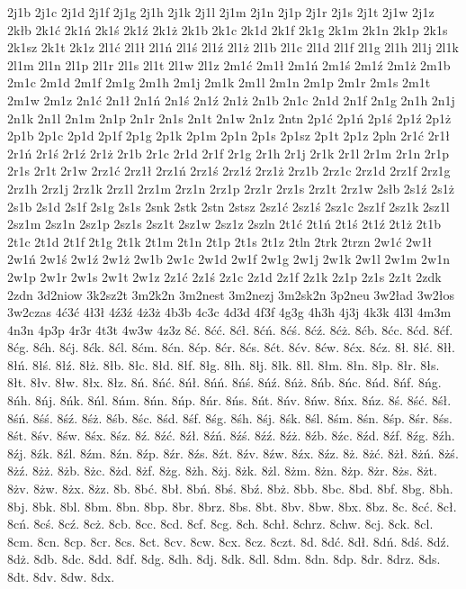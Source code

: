 {2j1b
2j1c
2j1d
2j1f
2j1g
2j1h
2j1k
2j1l
2j1m
2j1n
2j1p
2j1r
2j1s
2j1t
2j1w
2j1z
2kłb
2k1ć
2k1ń
2k1ś
2k1ź
2k1ż
2k1b
2k1c
2k1d
2k1f
2k1g
2k1m
2k1n
2k1p
2k1s
2k1sz
2k1t
2k1z
2l1ć
2l1ł
2l1ń
2l1ś
2l1ź
2l1ż
2l1b
2l1c
2l1d
2l1f
2l1g
2l1h
2l1j
2l1k
2l1m
2l1n
2l1p
2l1r
2l1s
2l1t
2l1w
2l1z
2m1ć
2m1ł
2m1ń
2m1ś
2m1ź
2m1ż
2m1b
2m1c
2m1d
2m1f
2m1g
2m1h
2m1j
2m1k
2m1l
2m1n
2m1p
2m1r
2m1s
2m1t
2m1w
2m1z
2n1ć
2n1ł
2n1ń
2n1ś
2n1ź
2n1ż
2n1b
2n1c
2n1d
2n1f
2n1g
2n1h
2n1j
2n1k
2n1l
2n1m
2n1p
2n1r
2n1s
2n1t
2n1w
2n1z
2ntn
2p1ć
2p1ń
2p1ś
2p1ź
2p1ż
2p1b
2p1c
2p1d
2p1f
2p1g
2p1k
2p1m
2p1n
2p1s
2p1sz
2p1t
2p1z
2pln
2r1ć
2r1ł
2r1ń
2r1ś
2r1ź
2r1ż
2r1b
2r1c
2r1d
2r1f
2r1g
2r1h
2r1j
2r1k
2r1l
2r1m
2r1n
2r1p
2r1s
2r1t
2r1w
2rz1ć
2rz1ł
2rz1ń
2rz1ś
2rz1ź
2rz1ż
2rz1b
2rz1c
2rz1d
2rz1f
2rz1g
2rz1h
2rz1j
2rz1k
2rz1l
2rz1m
2rz1n
2rz1p
2rz1r
2rz1s
2rz1t
2rz1w
2słb
2s1ź
2s1ż
2s1b
2s1d
2s1f
2s1g
2s1s
2snk
2stk
2stn
2stsz
2sz1ć
2sz1ś
2sz1c
2sz1f
2sz1k
2sz1l
2sz1m
2sz1n
2sz1p
2sz1s
2sz1t
2sz1w
2sz1z
2szln
2t1ć
2t1ń
2t1ś
2t1ź
2t1ż
2t1b
2t1c
2t1d
2t1f
2t1g
2t1k
2t1m
2t1n
2t1p
2t1s
2t1z
2tln
2trk
2trzn
2w1ć
2w1ł
2w1ń
2w1ś
2w1ź
2w1ż
2w1b
2w1c
2w1d
2w1f
2w1g
2w1j
2w1k
2w1l
2w1m
2w1n
2w1p
2w1r
2w1s
2w1t
2w1z
2z1ć
2z1ś
2z1c
2z1d
2z1f
2z1k
2z1p
2z1s
2z1t
2zdk
2zdn
3d2niow
3k2sz2t
3m2k2n
3m2nest
3m2nezj
3m2sk2n
3p2neu
3w2ład
3w2łos
3w2czas
4ć3ć
4ł3ł
4ź3ź
4ż3ż
4b3b
4c3c
4d3d
4f3f
4g3g
4h3h
4j3j
4k3k
4l3l
4m3m
4n3n
4p3p
4r3r
4t3t
4w3w
4z3z
8ć.
8ćć.
8ćł.
8ćń.
8ćś.
8ćź.
8ćż.
8ćb.
8ćc.
8ćd.
8ćf.
8ćg.
8ćh.
8ćj.
8ćk.
8ćl.
8ćm.
8ćn.
8ćp.
8ćr.
8ćs.
8ćt.
8ćv.
8ćw.
8ćx.
8ćz.
8ł.
8łć.
8łł.
8łń.
8łś.
8łź.
8łż.
8łb.
8łc.
8łd.
8łf.
8łg.
8łh.
8łj.
8łk.
8łl.
8łm.
8łn.
8łp.
8łr.
8łs.
8łt.
8łv.
8łw.
8łx.
8łz.
8ń.
8ńć.
8ńł.
8ńń.
8ńś.
8ńź.
8ńż.
8ńb.
8ńc.
8ńd.
8ńf.
8ńg.
8ńh.
8ńj.
8ńk.
8ńl.
8ńm.
8ńn.
8ńp.
8ńr.
8ńs.
8ńt.
8ńv.
8ńw.
8ńx.
8ńz.
8ś.
8ść.
8śł.
8śń.
8śś.
8śź.
8śż.
8śb.
8śc.
8śd.
8śf.
8śg.
8śh.
8śj.
8śk.
8śl.
8śm.
8śn.
8śp.
8śr.
8śs.
8śt.
8śv.
8św.
8śx.
8śz.
8ź.
8źć.
8źł.
8źń.
8źś.
8źź.
8źż.
8źb.
8źc.
8źd.
8źf.
8źg.
8źh.
8źj.
8źk.
8źl.
8źm.
8źn.
8źp.
8źr.
8źs.
8źt.
8źv.
8źw.
8źx.
8źz.
8ż.
8żć.
8żł.
8żń.
8żś.
8żź.
8żż.
8żb.
8żc.
8żd.
8żf.
8żg.
8żh.
8żj.
8żk.
8żl.
8żm.
8żn.
8żp.
8żr.
8żs.
8żt.
8żv.
8żw.
8żx.
8żz.
8b.
8bć.
8bł.
8bń.
8bś.
8bź.
8bż.
8bb.
8bc.
8bd.
8bf.
8bg.
8bh.
8bj.
8bk.
8bl.
8bm.
8bn.
8bp.
8br.
8brz.
8bs.
8bt.
8bv.
8bw.
8bx.
8bz.
8c.
8cć.
8cł.
8cń.
8cś.
8cź.
8cż.
8cb.
8cc.
8cd.
8cf.
8cg.
8ch.
8chł.
8chrz.
8chw.
8cj.
8ck.
8cl.
8cm.
8cn.
8cp.
8cr.
8cs.
8ct.
8cv.
8cw.
8cx.
8cz.
8czt.
8d.
8dć.
8dł.
8dń.
8dś.
8dź.
8dż.
8db.
8dc.
8dd.
8df.
8dg.
8dh.
8dj.
8dk.
8dl.
8dm.
8dn.
8dp.
8dr.
8drz.
8ds.
8dt.
8dv.
8dw.
8dx.
}
